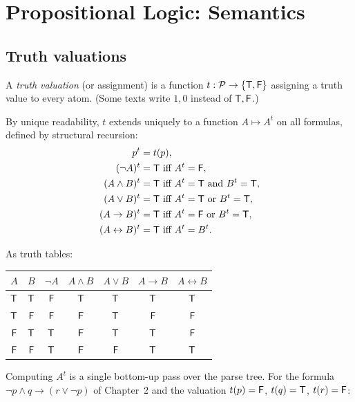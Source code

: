 \chapter{Propositional Logic: Semantics}\label{ch:propsem}

\section{Truth valuations}

\begin{definition}
A \emph{truth valuation} (or assignment) is a function $t:\mathcal{P}\to\{\mathsf{T},\mathsf{F}\}$ assigning
a truth value to every atom. (Some texts write $1,0$ instead of $\mathsf{T},\mathsf{F}$.)
\end{definition}

By unique readability, $t$ extends uniquely to a function $A \mapsto A^t$ on all formulas,
defined by structural recursion:
\begin{align*}
  p^t &= t(p),\\
  (\neg A)^t &= \mathsf{T} \text{ iff } A^t = \mathsf{F},\\
  (A\land B)^t &= \mathsf{T} \text{ iff } A^t=\mathsf{T} \text{ and } B^t=\mathsf{T},\\
  (A\lor B)^t &= \mathsf{T} \text{ iff } A^t=\mathsf{T} \text{ or } B^t=\mathsf{T},\\
  (A\to B)^t &= \mathsf{T} \text{ iff } A^t=\mathsf{F} \text{ or } B^t=\mathsf{T},\\
  (A\leftrightarrow B)^t &= \mathsf{T} \text{ iff } A^t = B^t.
\end{align*}

As truth tables:
\begin{center}
\begin{tabular}{cc|c|cccc}
$A$ & $B$ & $\neg A$ & $A\land B$ & $A\lor B$ & $A\to B$ & $A\leftrightarrow B$\\
\hline
$\mathsf{T}$&$\mathsf{T}$&$\mathsf{F}$&$\mathsf{T}$&$\mathsf{T}$&$\mathsf{T}$&$\mathsf{T}$\\
$\mathsf{T}$&$\mathsf{F}$&$\mathsf{F}$&$\mathsf{F}$&$\mathsf{T}$&$\mathsf{F}$&$\mathsf{F}$\\
$\mathsf{F}$&$\mathsf{T}$&$\mathsf{T}$&$\mathsf{F}$&$\mathsf{T}$&$\mathsf{T}$&$\mathsf{F}$\\
$\mathsf{F}$&$\mathsf{F}$&$\mathsf{T}$&$\mathsf{F}$&$\mathsf{F}$&$\mathsf{T}$&$\mathsf{T}$\\
\end{tabular}
\end{center}

Computing $A^t$ is a single bottom-up pass over the parse tree. For the formula
$\neg p\land q\to(r\lor\neg p)$ of Chapter~2 and the valuation $t(p)=\mathsf{F}$, $t(q)=\mathsf{T}$,
$t(r)=\mathsf{F}$:
\begin{center}
\end{center}

